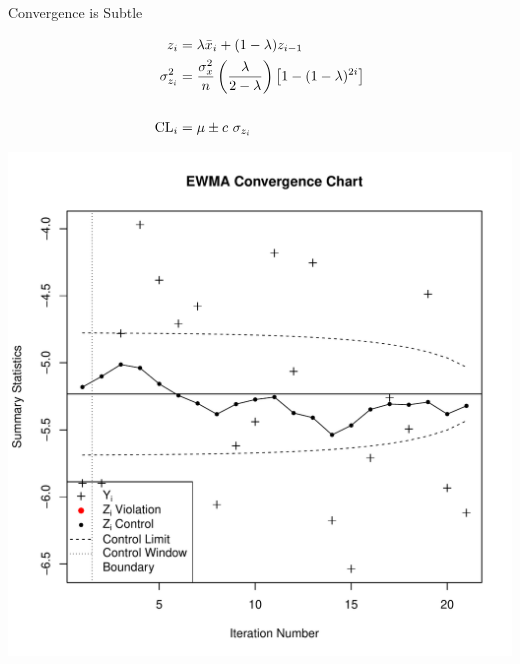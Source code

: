 \documentclass[ xcolor = pdftex, dvipsnames, table ]{beamer}
\begin{document}
\subsection{}
\begin{frame}{Convergence is Subtle}
\vspace{0.5cm}
\begin{minipage}[h!]{0.6\textwidth}
\begin{align*}
	\hspace*{-1cm}
	z_i &= \lambda \bar x_i+(1-\lambda)z_{i-1}\\
	\sigma^2_{z_i} &= \frac{{\sigma^2_x}}{n} \left(\frac{\lambda}{2-\lambda}\right)\left[1-(1-\lambda)^{2i}\right]\\
	&\\
	\text{CL}_i &=  \mu \pm c ~ \sigma_{z_i}
\end{align*}
\end{minipage}
\begin{minipage}[h!]{0.38\textwidth}
\begin{center}
\includegraphics[width=\textwidth]{ewmaConvChartEasomMedStart.pdf}
\end{center}
\end{minipage}


\end{frame}
\end{document}
